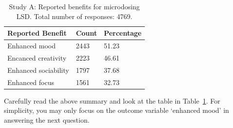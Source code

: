 \begin{table}[h!]
\caption{Study A: Reported benefits for microdosing LSD. Total number of responses: 4769.
\label{tab:study-A}}
\begin{center}
\begin{tabular}{ l|l|l }
    Reported Benefit & Count & Percentage \\
 \hline
   Enhanced mood & 2443 & 51.23 \\
   Encanced creativity & 2223 & 46.61\\
   Enhanced sociability & 1797 & 37.68\\
   Enhanced focus & 1561 & 32.73
\end{tabular}
\end{center}
\end{table}

Carefully read the above summary and look at the table in Table~\ref{tab:study-A}.
For simplicity, you may only focus on the outcome variable `enhanced mood' in answering the next question.

